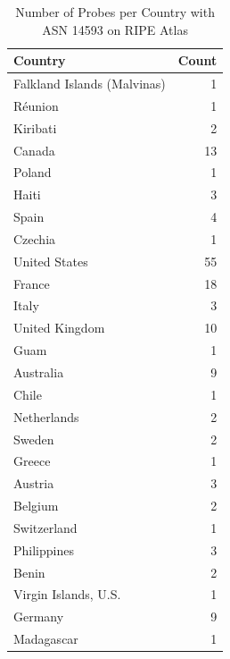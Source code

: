\begin{table}
	\caption{Number of Probes per Country with ASN 14593 on RIPE Atlas}
	\label{fig:probes-per-country}
	\begin{tabular}{lr}
		\toprule
		Country                     & Count \\
		\midrule
		Falkland Islands (Malvinas) & 1     \\
		Réunion                     & 1     \\
		Kiribati                    & 2     \\
		Canada                      & 13    \\
		Poland                      & 1     \\
		Haiti                       & 3     \\
		Spain                       & 4     \\
		Czechia                     & 1     \\
		United States               & 55    \\
		France                      & 18    \\
		Italy                       & 3     \\
		United Kingdom              & 10    \\
		Guam                        & 1     \\
		Australia                   & 9     \\
		Chile                       & 1     \\
		Netherlands                 & 2     \\
		Sweden                      & 2     \\
		Greece                      & 1     \\
		Austria                     & 3     \\
		Belgium                     & 2     \\
		Switzerland                 & 1     \\
		Philippines                 & 3     \\
		Benin                       & 2     \\
		Virgin Islands, U.S.        & 1     \\
		Germany                     & 9     \\
		Madagascar                  & 1     \\
		\bottomrule
	\end{tabular}
\end{table}


